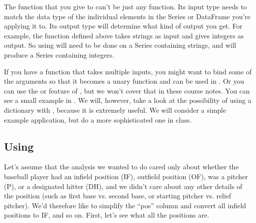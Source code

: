 \documentclass[letterpaper,10pt,english]{sphinxmanual}
\begin{document}
The function that you give to  can’t be just any function.  Its input type needs to match the data type of the individual elements in the Series or DataFrame you’re applying it to.  Its output type will determine what kind of output you get.  For example, the  function defined above takes strings as input and gives integers as output.  So using  will need to be done on a Series containing strings, and will produce a Series containing integers.

If you have a function that takes multiple inputs, you might want to bind some of the arguments so that it becomes a unary function and can be used in .  Or you can use the  or  feature of , but we won’t cover that in these course notes.  You can see a small example in .  We will, however, take a look at the possibility of using a dictionary with , because it is extremely useful.  We will consider a simple example application, but do a more sophisticated one in class.


\subsection{Using }
\label{\detokenize{chapter-11-processing-rows:using-map}}
Let’s assume that the analysis we wanted to do cared only about whether the baseball player had an infield position (IF), outfield position (OF), was a pitcher (P), or a designated hitter (DH), and we didn’t care about any other details of the position (such as first base vs. second base, or starting pitcher vs. relief pitcher).  We’d therefore like to simplify the “pos” column and convert all infield positions to IF, and so on.  First, let’s see what all the positions are.

\begin{sphinxVerbatim}[commandchars=\\\{\}]
\PYG{p}{[}\PYG{p}{]}
\end{sphinxVerbatim}
\end{document}
